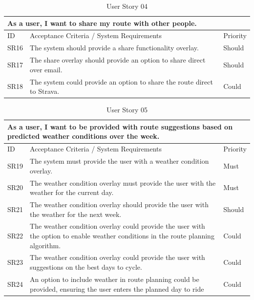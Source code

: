 \begin{table}[!htb]
  \caption{User Story 04}
  \label{tab:user-story-04}
  \begin{tabular}{ m{1cm} m{11cm} m{1cm} }
  \hline
  \multicolumn{3}{p{13cm}}{As a user, I want to share my route with other people.}\\ 
  \hline
  ID & Acceptance Criteria / System Requirements & Priority\\
  \hline
  \label{SR:16}SR16 & The system should provide a share functionality overlay. & Should \\
  \label{SR:17}SR17 & The share overlay should provide an option to share direct over email. & Should\\
  \label{SR:18}SR18 & The system could provide an option to share the route direct to Strava. & Could\\ 
  \hline
  \end{tabular}
\end{table}

\begin{table}[!htb]
  \caption{User Story 05}
  \label{tab:user-story-05}
  \begin{tabular}{ m{1cm} m{11cm} m{1cm} }
  \hline
  \multicolumn{3}{p{13cm}}{As a user, I want to be provided with route suggestions based on predicted weather conditions over the week.}\\ 
  \hline
  ID & Acceptance Criteria / System Requirements & Priority\\
  \hline
  \label{SR:19}SR19 & The system must provide the user with a weather condition overlay. & Must \\
  \label{SR:20}SR20 & The weather condition overlay must provide the user with the weather for the current day. & Must\\
  \label{SR:21}SR21 & The weather condition overlay should provide the user with the weather for the next week. & Should\\
  \label{SR:22}SR22 & The weather condition overlay could provide the user with the option to enable weather conditions in the route planning algorithm. & Could\\ 
  \label{SR:23}SR23 & The weather condition overlay could provide the user with suggestions on the best days to cycle. & Could\\
  \label{SR:24}SR24 & An option to include weather in route planning could be provided, ensuring the user enters the planned day to ride & Could\\ 
  \hline
  \end{tabular}
\end{table}

